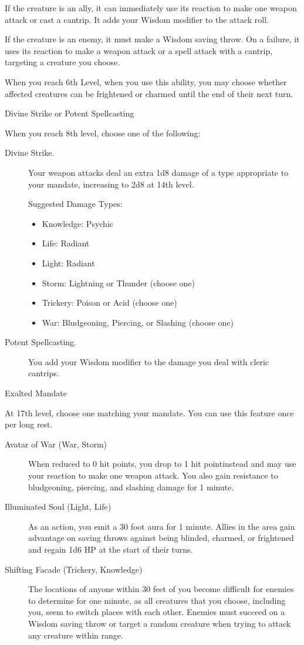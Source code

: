 \begin{description}
If the creature is an ally, it can immediately use its reaction to make
one weapon attack or cast a cantrip. It adds your Wisdom modifier to the
attack roll.

If the creature is an enemy, it must make a Wisdom saving throw. On a
failure, it uses its reaction to make a weapon attack or a spell attack
with a cantrip, targeting a creature you choose.

When you reach 6th Level, when you use this ability, you may choose
whether affected creatures can be frightened or charmed until the end of
their next turn.
\end{description}

Divine Strike or Potent Spellcasting

When you reach 8th level, choose one of the following:

\begin{description}
\item[Divine Strike.]
Your weapon attacks deal an extra 1d8 damage of a type appropriate to
your mandate, increasing to 2d8 at 14th level.

Suggested Damage Types:

\begin{itemize}
\item
  Knowledge: Psychic
\item
  Life: Radiant
\item
  Light: Radiant
\item
  Storm: Lightning or Thunder (choose one)
\item
  Trickery: Poison or Acid (choose one)
\item
  War: Bludgeoning, Piercing, or Slashing (choose one)
\end{itemize}
\item[Potent Spellcasting.]
You add your Wisdom modifier to the damage you deal with cleric
cantrips.
\end{description}

Exalted Mandate

At 17th level, choose one matching your mandate. You can use this
feature once per long rest.

\begin{description}
\item[Avatar of War (War, Storm)]
When reduced to 0 hit points, you drop to 1 hit pointinstead and may use
your reaction to make one weapon attack. You also gain resistance to
bludgeoning, piercing, and slashing damage for 1 minute.
\item[Illuminated Soul (Light, Life)]
As an action, you emit a 30 foot aura for 1 minute. Allies in the area
gain advantage on saving throws against being blinded, charmed, or
frightened and regain 1d6 HP at the start of their turns.
\item[Shifting Facade (Trickery, Knowledge)]
The locations of anyone within 30 feet of you become difficult for
enemies to determine for one minute, as all creatures that you choose,
including you, seem to switch places with each other. Enemies must
succeed on a Wisdom saving throw or target a random creature when trying
to attack any creature within range.
\end{description}

